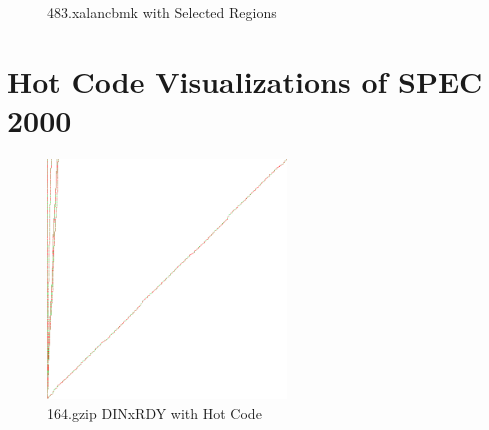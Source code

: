 \documentclass[defaultstyle,11pt]{thesis}
\begin{document}
\begin{figure}
  \centering
  \hspace{5mm}
  \caption{483.xalancbmk with Selected Regions}
  \label{fig:483xalancbmksel}
\end{figure}

\chapter{Hot Code Visualizations of SPEC 2000} 
\label{appdx:hotcode2000}

\begin{figure}
  \centering
  \includegraphics[height=2.50in]{images/hotcode/164gzipRunRef1_1000mil}
  \caption{164.gzip DINxRDY with Hot Code}
  \label{fig:164gziphot}
\end{figure}
\end{document}
